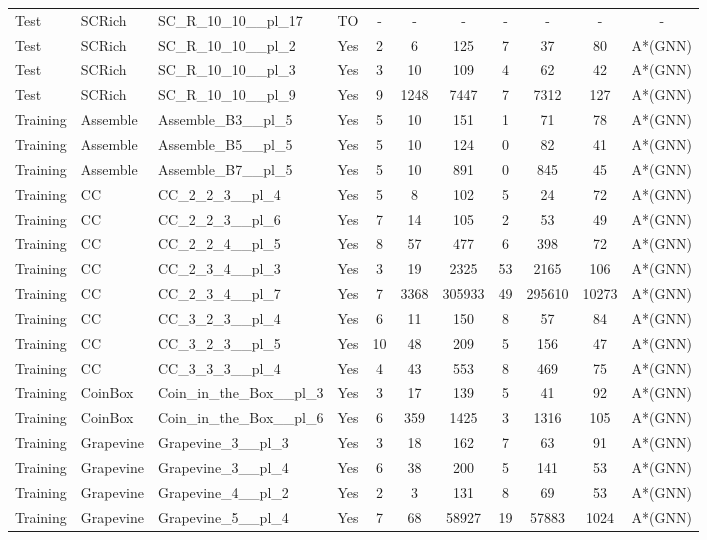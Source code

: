 \documentclass{article}
\begin{document}
\begin{tabular}{lllcccccccc}
Test & SCRich & SC\_R\_10\_10\_\_pl\_17 & TO & - & - & - & - & - & - & - \\
Test & SCRich & SC\_R\_10\_10\_\_pl\_2 & Yes & 2 & 6 & 125 & 7 & 37 & 80 & A*(GNN) \\
Test & SCRich & SC\_R\_10\_10\_\_pl\_3 & Yes & 3 & 10 & 109 & 4 & 62 & 42 & A*(GNN) \\
Test & SCRich & SC\_R\_10\_10\_\_pl\_9 & Yes & 9 & 1248 & 7447 & 7 & 7312 & 127 & A*(GNN) \\
Training & Assemble & Assemble\_B3\_\_pl\_5 & Yes & 5 & 10 & 151 & 1 & 71 & 78 & A*(GNN) \\
Training & Assemble & Assemble\_B5\_\_pl\_5 & Yes & 5 & 10 & 124 & 0 & 82 & 41 & A*(GNN) \\
Training & Assemble & Assemble\_B7\_\_pl\_5 & Yes & 5 & 10 & 891 & 0 & 845 & 45 & A*(GNN) \\
Training & CC & CC\_2\_2\_3\_\_pl\_4 & Yes & 5 & 8 & 102 & 5 & 24 & 72 & A*(GNN) \\
Training & CC & CC\_2\_2\_3\_\_pl\_6 & Yes & 7 & 14 & 105 & 2 & 53 & 49 & A*(GNN) \\
Training & CC & CC\_2\_2\_4\_\_pl\_5 & Yes & 8 & 57 & 477 & 6 & 398 & 72 & A*(GNN) \\
Training & CC & CC\_2\_3\_4\_\_pl\_3 & Yes & 3 & 19 & 2325 & 53 & 2165 & 106 & A*(GNN) \\
Training & CC & CC\_2\_3\_4\_\_pl\_7 & Yes & 7 & 3368 & 305933 & 49 & 295610 & 10273 & A*(GNN) \\
Training & CC & CC\_3\_2\_3\_\_pl\_4 & Yes & 6 & 11 & 150 & 8 & 57 & 84 & A*(GNN) \\
Training & CC & CC\_3\_2\_3\_\_pl\_5 & Yes & 10 & 48 & 209 & 5 & 156 & 47 & A*(GNN) \\
Training & CC & CC\_3\_3\_3\_\_pl\_4 & Yes & 4 & 43 & 553 & 8 & 469 & 75 & A*(GNN) \\
Training & CoinBox & Coin\_in\_the\_Box\_\_pl\_3 & Yes & 3 & 17 & 139 & 5 & 41 & 92 & A*(GNN) \\
Training & CoinBox & Coin\_in\_the\_Box\_\_pl\_6 & Yes & 6 & 359 & 1425 & 3 & 1316 & 105 & A*(GNN) \\
Training & Grapevine & Grapevine\_3\_\_pl\_3 & Yes & 3 & 18 & 162 & 7 & 63 & 91 & A*(GNN) \\
Training & Grapevine & Grapevine\_3\_\_pl\_4 & Yes & 6 & 38 & 200 & 5 & 141 & 53 & A*(GNN) \\
Training & Grapevine & Grapevine\_4\_\_pl\_2 & Yes & 2 & 3 & 131 & 8 & 69 & 53 & A*(GNN) \\
Training & Grapevine & Grapevine\_5\_\_pl\_4 & Yes & 7 & 68 & 58927 & 19 & 57883 & 1024 & A*(GNN) \\

\end{tabular}
\end{document}
